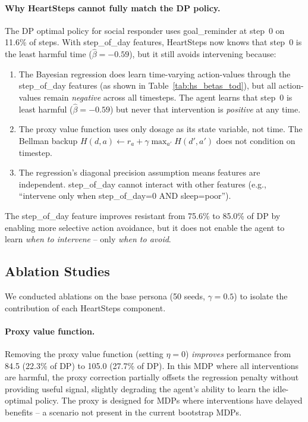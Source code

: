 \documentclass[11pt]{article}
\begin{document}
\paragraph{Why HeartSteps cannot fully match the DP policy.}
The DP optimal policy for social responder uses goal\_reminder at step~0 on 11.6\% of steps. With step\_of\_day features, HeartSteps now knows that step~0 is the least harmful time ($\hat{\beta} = -0.59$), but it still avoids intervening because:
\begin{enumerate}
  \item The Bayesian regression does learn time-varying action-values through the step\_of\_day features (as shown in Table~\ref{tab:hs_betas_tod}), but all action-values remain \emph{negative} across all timesteps. The agent learns that step~0 is least harmful ($\hat{\beta} = -0.59$) but never that intervention is \emph{positive} at any time.
  \item The proxy value function uses only dosage as its state variable, not time. The Bellman backup $H(d, a) \leftarrow r_a + \gamma \max_{a'} H(d', a')$ does not condition on timestep.
  \item The regression's diagonal precision assumption means features are independent. step\_of\_day cannot interact with other features (e.g., ``intervene only when step\_of\_day=0 AND sleep=poor'').
\end{enumerate}
The step\_of\_day feature improves resistant from 75.6\% to 85.0\% of DP by enabling more selective action avoidance, but it does not enable the agent to learn \emph{when to intervene} -- only \emph{when to avoid}.

\subsection{Ablation Studies}

We conducted ablations on the base persona (50 seeds, $\gamma = 0.5$) to isolate the contribution of each HeartSteps component.

\paragraph{Proxy value function.}
Removing the proxy value function (setting $\eta = 0$) \emph{improves} performance from 84.5 (22.3\% of DP) to 105.0 (27.7\% of DP). In this MDP where all interventions are harmful, the proxy correction partially offsets the regression penalty without providing useful signal, slightly degrading the agent's ability to learn the idle-optimal policy. The proxy is designed for MDPs where interventions have delayed benefits -- a scenario not present in the current bootstrap MDPs.
\end{document}
